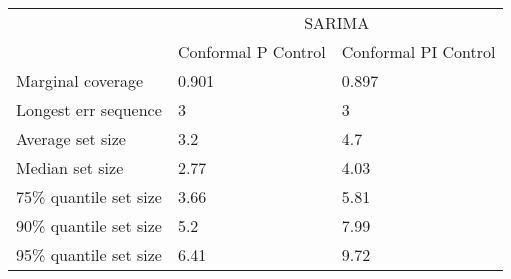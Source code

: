 \begin{tabular}{lll}
\toprule
& \multicolumn{2}{c}{SARIMA} \\
& Conformal P Control & Conformal PI Control \\
\midrule
Marginal coverage & 0.901 & 0.897 \\
Longest err sequence & 3 & 3 \\
Average set size & 3.2 & 4.7 \\
Median set size & 2.77 & 4.03 \\
75\% quantile set size & 3.66 & 5.81 \\
90\% quantile set size & 5.2 & 7.99 \\
95\% quantile set size & 6.41 & 9.72 \\
\bottomrule
\end{tabular}
